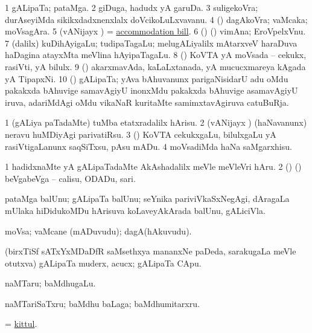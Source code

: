 \bentry
{}
\gl{\nA}
\bmng
\bnum
\num{1} gALipaTa; pataMga.  
\num{2} giDuga, hadudx yA garuDa. 
\num{3} suligekoVra; durAseyiMda sikikxdadxnenxlalx doVcikoLuLxvavanu. 
\num{4} (\pArxparx) dagAkoVra; vaMcaka; moVsagAra. 
\num{5} (vANijayx \ashi) = \hyperref{kandict_a.pdf}{A}{accommodation bill}{accommodation bill}. 
\num{6} (\birx) (\ashi) vimAna; EroVpelxVnu. 
\num{7} (\bava dalilx) kuDihAyigaLu; tudipaTagaLu; melugALiyalilx mAtarxveV haraDuva haDagina atayxMta meVlina hAyipaTagaLu. 
\num{8} (\ashi) KoVTA yA moVsada -- cekukx, rasiVti, yA bilulx. 
\num{9} (\ashi) akarxmavAda, kaLaLxtanada, yA mucucxmareya kAgada yA TipapxNi. 
\num{10} (\jAyx) gALipaTa; yAva bAhuvanunx parigaNisidarU adu oMdu pakakxda bAhuvige samavAgiyU inonxMdu pakakxda bAhuvige asamavAgiyU iruva, adariMdAgi oMdu vikaNaR kuritaMte samimxtavAgiruva catuBuRja. 
\enum
\emng
\eentry

\bentry
{}
\gl{\sakirx}
\bmng
\bnum
\num{1} (gALiya paTadaMte) tuMba etatxradalilx hArisu. 
\num{2} (vANijayx \ashi) (haNavanunx) neravu huMDiyAgi parivatiRsu. 
\num{3} (\ashi) KoVTA cekukxgaLu, bilulxgaLu yA rasiVtigaLanunx saqSiTxsu, pAsu mADu. 
\num{4} moVsadiMda haNa saMgarxhisu. 
\enum
\emng

\noindent
\gl{\akirx}
\bmng
\bnum
\num{1} hadidxnaMte yA gALipaTadaMte AkAshadalilx meVle meVleVri hAru. 
\num{2} (\ame) (\AmA) beVgabeVga -- calisu, ODADu, sari. 
\enum
\emng
\eentry

\bentry
{}
\gl{\nA}
\bmng
pataMga balUnu; gALipaTa balUnu; seYnika pariviVkaSxNegAgi, dAragaLa mUlaka hiDidukoMDu hArisuva koLaveyAkArada balUnu, gALiciVla. 
\emng
\eentry

\bentry
{}
\gl{\nA}
\bmng
moVsa; vaMcane (mADuvudu); dagA(hAkuvudu). 
\emng
\eentry

\bentry
{}
\gl{\nA}
\bmng
(birxTiSf sATxYxMDaDfR saMsethxya mananxNe paDeda, sarakugaLa meVle otutxva) gALipaTa muderx, acucx; gALipaTa CApu. 
\emng
\eentry

\bentry
{}
\gl{\nA}
\bmng
naMTaru; baMdhugaLu. 
\emng

\noindent
\gl{\pagu}
\bmng
\hypertarget{kith pagu}{}  naMTariSaTxru; baMdhu baLaga; baMdhumitarxru. 
\emng
\eentry

\bentry
{}
\gl{\nA}
\bmng
 = \hyperlink{kittul}{kittul}. 
\emng
\eentry

